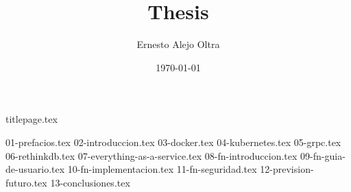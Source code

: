 \documentclass[
    a4paper,
    12pt
]{report}
\title{Thesis}
\author{Ernesto Alejo Oltra}
\date{\today}
\begin{document}
{titlepage.tex}

{01-prefacios.tex}
{02-introduccion.tex}
{03-docker.tex}
{04-kubernetes.tex}
{05-grpc.tex}
{06-rethinkdb.tex}
{07-everything-as-a-service.tex}
{08-fn-introduccion.tex}
{09-fn-guia-de-usuario.tex}
{10-fn-implementacion.tex}
{11-fn-seguridad.tex}
{12-prevision-futuro.tex}
{13-conclusiones.tex}

\printbibliography
\end{document}
